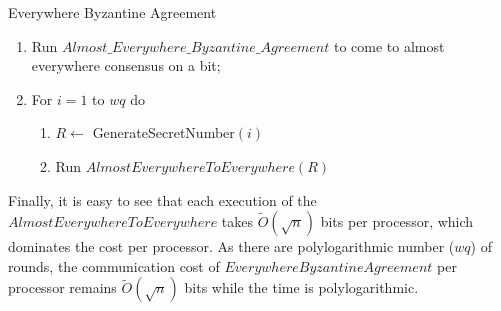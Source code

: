 \documentclass[letterpaper,11pt]{article}
\begin{document}
\begin{algorithm}
\caption{Everywhere Byzantine Agreement}

\begin{enumerate}
\item
Run $Almost\_Everywhere\_Byzantine\_ Agreement$  to come to almost everywhere consensus on a bit;
\item
For $i=1$ to  $wq$ do
\begin{enumerate}
\item
$R \leftarrow $ GenerateSecretNumber$(i)$
\item
Run $AlmostEverywhereToEverywhere(R)$
\end{enumerate}
\end{enumerate}
\end{algorithm}

Finally,  it is easy to see that each execution of the $AlmostEverywhereToEverywhere$ takes $\tilde{O}(\sqrt{n})$ bits per
processor, which dominates the cost per processor. As there are polylogarithmic number ($wq$) of rounds, the communication cost  of $Everywhere Byzantine Agreement$ per processor remains  $\tilde{O}(\sqrt{n})$ bits while the time is polylogarithmic. 
\end{document}

